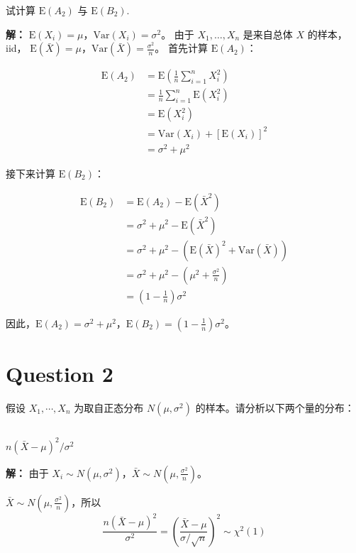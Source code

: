 \documentclass[12pt,a4paper]{article}
\begin{document}
试计算 $\mathrm{E}(A_2)$ 与 $\mathrm{E}(B_2)$.
\begin{answerbox}
\textbf{解：}
  $\mathrm{E}(X_i) = \mu$，$\mathrm{Var}(X_i) = \sigma^2$。
  由于 $X_1,\ldots,X_n$ 是来自总体 $X$ 的样本，iid，
  $\mathrm{E}(\bar{X}) = \mu$，$\mathrm{Var}(\bar{X}) = \frac{\sigma^2}{n}$。
  首先计算 $\mathrm{E}(A_2)$：

  \begin{align*}
    \mathrm{E}(A_2) &= \mathrm{E}\left(\frac{1}{n}\sum_{i=1}^n X_i^2\right) \\
    &= \frac{1}{n}\sum_{i=1}^n \mathrm{E}(X_i^2) \\
    &= \mathrm{E}(X_i^2) \\
    &= \mathrm{Var}(X_i) + [\mathrm{E}(X_i)]^2 \\
    &= \sigma^2 + \mu^2
  \end{align*}

  接下来计算 $\mathrm{E}(B_2)$：

  \begin{align*}
    \mathrm{E}(B_2) &= \mathrm{E}(A_2) - \mathrm{E}(\bar{X}^2) \\
    &= \sigma^2 + \mu^2 - \mathrm{E}(\bar{X}^2) \\
    &= \sigma^2 + \mu^2 - (\mathrm{E}(\bar{X})^2+\mathrm{Var}(\bar{X})) \\
    &= \sigma^2 + \mu^2 - (\mu^2 + \frac{\sigma^2}{n}) \\
    &= (1-\frac{1}{n})\sigma^2
  \end{align*}

  因此，$\mathrm{E}(A_2) = \sigma^2 + \mu^2$，$\mathrm{E}(B_2) = (1-\frac{1}{n})\sigma^2$。
\end{answerbox}


\section{Question 2}

假设 $X_1,\cdots,X_n$ 为取自正态分布 $N(\mu,\sigma^2)$ 的样本。请分析以下两个量的分布：

\subsection{}
$n(\bar{X}-\mu)^2/\sigma^2$

\begin{answerbox}
\textbf{解：}
由于 $X_i \sim N(\mu, \sigma^2)$，$\bar{X} \sim N(\mu, \frac{\sigma^2}{n})$。

$\bar{X} \sim N(\mu, \frac{\sigma^2}{n})$，所以 
$$
\frac{n(\bar{X}-\mu)^2}{\sigma^2} = (\frac{\bar{X}-\mu}{\sigma/\sqrt{n}})^2 \sim \chi^2(1)
$$
\end{answerbox}
\end{document}
